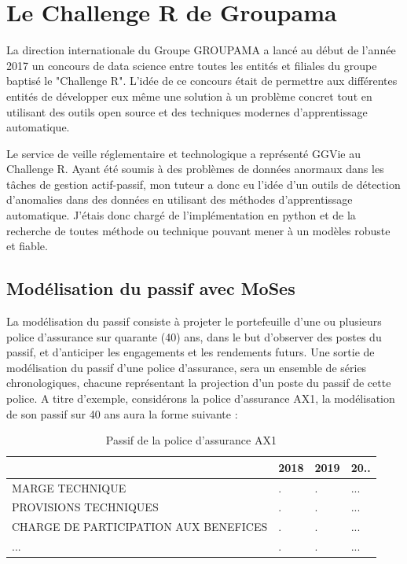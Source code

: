 \chapter{Le Challenge R de Groupama}

La direction internationale du Groupe GROUPAMA a lancé au début de l'année 2017 un concours de data science entre toutes les entités et filiales du groupe baptisé le "Challenge R". L'idée de ce concours était de permettre aux différentes entités de développer eux même une solution à un problème concret tout en utilisant des outils open source et des techniques modernes d'apprentissage automatique.

Le service de veille réglementaire et technologique a représenté GGVie au Challenge R. Ayant été soumis à des problèmes de données anormaux dans les tâches de gestion actif-passif, mon tuteur a donc eu l'idée d'un outils de détection d'anomalies dans des données en utilisant des méthodes d'apprentissage automatique. J'étais donc  chargé de l'implémentation en python et de la recherche de toutes méthode ou technique pouvant mener à un modèles robuste et fiable.

\section{Modélisation du passif avec MoSes}

La modélisation du passif consiste à projeter le portefeuille d'une ou plusieurs police d'assurance sur quarante (40) ans, dans le but d’observer des postes du passif, et d'anticiper les engagements et les rendements futurs.
Une sortie de modélisation du passif d'une police d'assurance, sera un ensemble de séries chronologiques, chacune représentant la projection d'un poste du passif de cette police. 
A titre d'exemple, considérons la police d'assurance AX1, la modélisation de son passif sur 40 ans aura la forme suivante : 
\begin{table}[H]
\centering
\caption{Passif de la police d'assurance \textsc{AX1}}
\label{my-label}
\begin{tabular}{|l|l|l|l|}
\hline
    &  2018   &  2019   &  20..  \\ \hline
 MARGE TECHNIQUE   &  .   &   .  &  ...  \\ \hline
 PROVISIONS TECHNIQUES  &  .   &  .   &  ...  \\ \hline
 CHARGE DE PARTICIPATION AUX BENEFICES  &   .  &   .  &  ...  \\ \hline
  ...  &  .   &  .   &   ... \\ \hline
\end{tabular}
\end{table}

